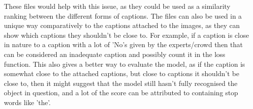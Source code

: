 \documentclass{article}
\begin{document}
    These files would help with this issue, as they could be used as a similarity ranking between the different forms of captions. The files can also be used in a unique way comparatively to the captions attached to the images, as they can show which captions they shouldn't be close to. For example, if a caption is close in nature to a caption with a lot of 'No's given by the experts/crowd then that can be considered an inadequate caption and possibly count it in the loss function. This also gives a better way to evaluate the model, as if the caption is somewhat close to the attached captions, but close to captions it shouldn't be close to, then it might suggest that the model still hasn't fully recognised the object in question, and a lot of the score can be attributed to containing stop words like 'the'.\\



    
    
\end{document}
